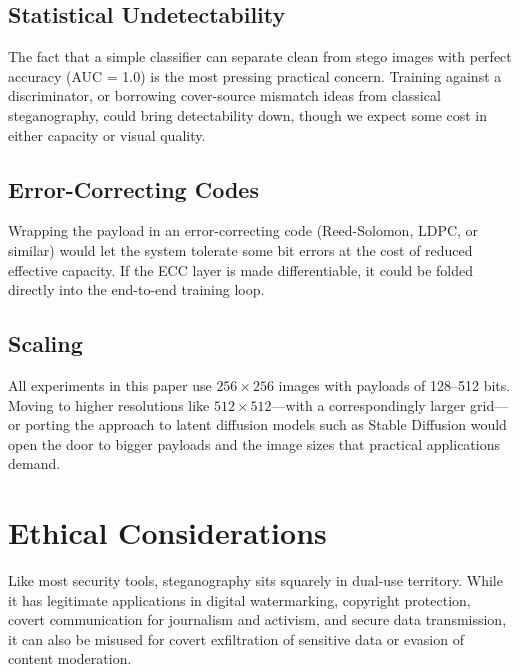 \documentclass[conference]{IEEEtran}
\begin{document}
\subsection{Statistical Undetectability}
The fact that a simple classifier can separate clean from stego images with perfect accuracy (AUC = 1.0) is the most pressing practical concern.
Training against a discriminator, or borrowing cover-source mismatch ideas from classical steganography, could bring detectability down, though we expect some cost in either capacity or visual quality.

\subsection{Error-Correcting Codes}
Wrapping the payload in an error-correcting code (Reed-Solomon, LDPC, or similar) would let the system tolerate some bit errors at the cost of reduced effective capacity.
If the ECC layer is made differentiable, it could be folded directly into the end-to-end training loop.

\subsection{Scaling}
All experiments in this paper use $256 \times 256$ images with payloads of 128--512 bits.
Moving to higher resolutions like $512 \times 512$---with a correspondingly larger grid---or porting the approach to latent diffusion models such as Stable Diffusion would open the door to bigger payloads and the image sizes that practical applications demand.


\section{Ethical Considerations}
\label{sec:ethics}

Like most security tools, steganography sits squarely in dual-use territory.
While it has legitimate applications in digital watermarking, copyright protection, covert communication for journalism and activism, and secure data transmission, it can also be misused for covert exfiltration of sensitive data or evasion of content moderation.
\end{document}
